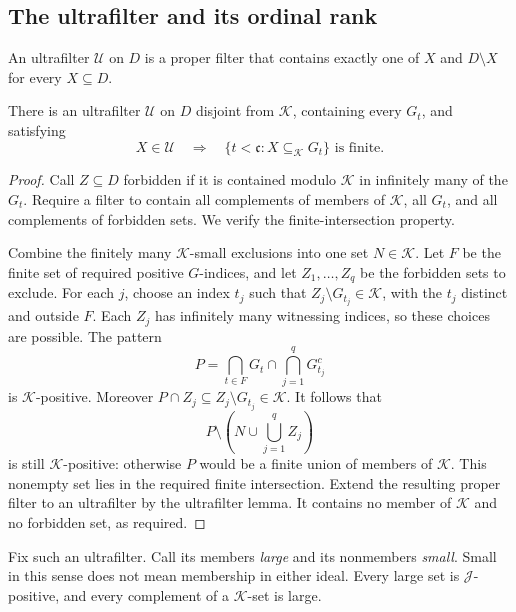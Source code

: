 \subsection{The ultrafilter and its ordinal rank}

An ultrafilter $\mathcal U$ on $D$ is a proper filter that contains
exactly one of $X$ and $D\setminus X$ for every $X\subseteq D$.

\begin{lemma}\label{lem:ultrafilter}
There is an ultrafilter $\mathcal U$ on $D$ disjoint from $\mathcal K$,
containing every $G_t$, and satisfying
\begin{equation}\label{eq:finitely-many-columns}
 X\in\mathcal U\quad\Longrightarrow\quad
 \{t<\mathfrak c:X\subseteq_{\mathcal K}G_t\}
 \text{ is finite}.
\end{equation}
\end{lemma}

\begin{proof}
Call $Z\subseteq D$ forbidden if it is contained modulo $\mathcal K$
in infinitely many of the $G_t$. Require a filter to contain all
complements of members of $\mathcal K$, all $G_t$, and all complements
of forbidden sets. We verify the finite-intersection property.

Combine the finitely many $\mathcal K$-small exclusions into one set
$N\in\mathcal K$. Let $F$ be the finite set of required positive
$G$-indices, and let $Z_1,\ldots,Z_q$ be the forbidden sets to exclude.
For each $j$, choose an index $t_j$ such that
$Z_j\setminus G_{t_j}\in\mathcal K$, with the $t_j$ distinct and
outside $F$. Each $Z_j$ has infinitely many witnessing indices, so
these choices are possible. The pattern
\[
 P=\bigcap_{t\in F}G_t\cap\bigcap_{j=1}^qG_{t_j}^c
\]
is $\mathcal K$-positive. Moreover
$P\cap Z_j\subseteq Z_j\setminus G_{t_j}\in\mathcal K$.
It follows that
\[
 P\setminus\left(N\cup\bigcup_{j=1}^qZ_j\right)
\]
is still $\mathcal K$-positive: otherwise $P$ would be a finite union
of members of $\mathcal K$. This nonempty set lies in the required
finite intersection. Extend the resulting proper filter to an
ultrafilter by the ultrafilter lemma. It contains no member of
$\mathcal K$ and no forbidden set, as required.
\end{proof}

Fix such an ultrafilter. Call its members \emph{large} and its
nonmembers \emph{small}. Small in this sense does not mean membership
in either ideal. Every large set is $\mathcal J$-positive, and every
complement of a $\mathcal K$-set is large.


